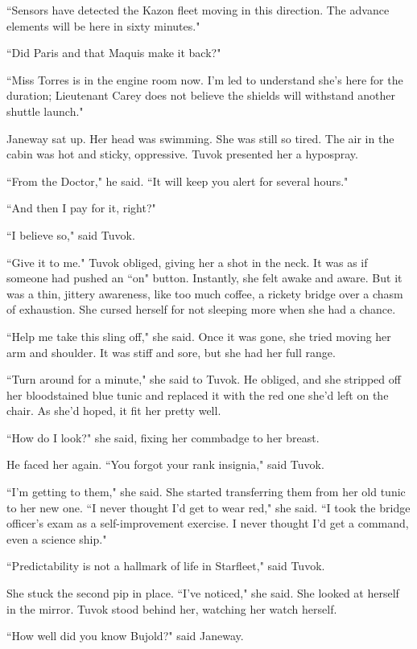 \documentclass[twoside,letterpaper,12pt]{memoir}
\begin{document}
``Sensors have detected the Kazon fleet moving in this direction. The advance elements will be here in sixty minutes."

``Did Paris and that Maquis make it back?"

``Miss Torres is in the engine room now. I'm led to understand she's here for the duration; Lieutenant Carey does not believe the shields will withstand another shuttle launch."

Janeway sat up. Her head was swimming. She was still so tired. The air in the cabin was hot and sticky, oppressive. Tuvok presented her a hypospray.

``From the Doctor," he said. ``It will keep you alert for several hours."

``And then I pay for it, right?"

``I believe so," said Tuvok.

``Give it to me." Tuvok obliged, giving her a shot in the neck. It was as if someone had pushed an ``on" button. Instantly, she felt awake and aware. But it was a thin, jittery awareness, like too much coffee, a rickety bridge over a chasm of exhaustion. She cursed herself for not sleeping more when she had a chance.

``Help me take this sling off," she said. Once it was gone, she tried moving her arm and shoulder. It was stiff and sore, but she had her full range.

``Turn around for a minute," she said to Tuvok. He obliged, and she stripped off her bloodstained blue tunic and replaced it with the red one she'd left on the chair. As she'd hoped, it fit her pretty well.

``How do I look?" she said, fixing her commbadge to her breast.

He faced her again. ``You forgot your rank insignia," said Tuvok.

``I'm getting to them," she said. She started transferring them from her old tunic to her new one. ``I never thought I'd get to wear red," she said. ``I took the bridge officer's exam as a self-improvement exercise. I never thought I'd get a command, even a science ship."

``Predictability is not a hallmark of life in Starfleet," said Tuvok.

She stuck the second pip in place. ``I've noticed," she said. She looked at herself in the mirror. Tuvok stood behind her, watching her watch herself.

``How well did you know Bujold?" said Janeway.
\end{document}
